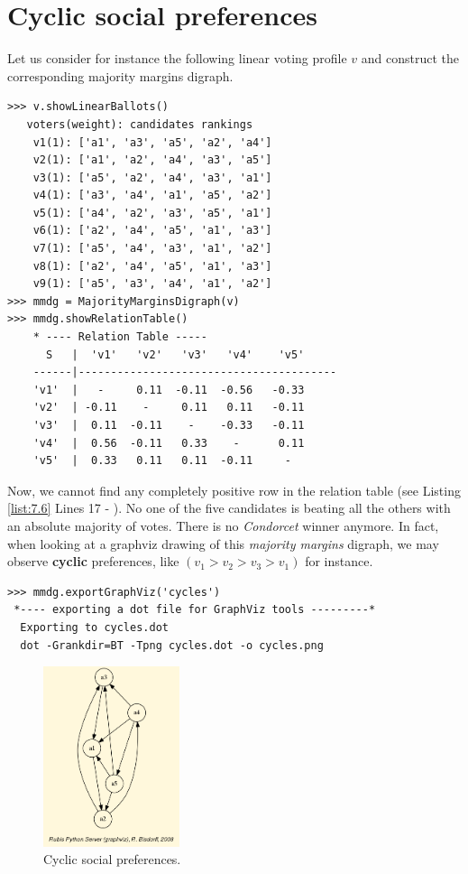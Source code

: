 \section{Cyclic social preferences}
\label{sec:7.4}

Let us consider for instance the following linear voting profile $v$ and construct the corresponding majority margins digraph.
\begin{lstlisting}[caption={Example of cyclic social preferences},label=list:7.6]
>>> v.showLinearBallots()
   voters(weight): candidates rankings
    v1(1): ['a1', 'a3', 'a5', 'a2', 'a4']
    v2(1): ['a1', 'a2', 'a4', 'a3', 'a5']
    v3(1): ['a5', 'a2', 'a4', 'a3', 'a1']
    v4(1): ['a3', 'a4', 'a1', 'a5', 'a2']
    v5(1): ['a4', 'a2', 'a3', 'a5', 'a1']
    v6(1): ['a2', 'a4', 'a5', 'a1', 'a3']
    v7(1): ['a5', 'a4', 'a3', 'a1', 'a2']
    v8(1): ['a2', 'a4', 'a5', 'a1', 'a3']
    v9(1): ['a5', 'a3', 'a4', 'a1', 'a2']
>>> mmdg = MajorityMarginsDigraph(v)
>>> mmdg.showRelationTable()
    * ---- Relation Table -----
      S   |  'v1'   'v2'   'v3'	  'v4'	  'v5'	  
    ------|----------------------------------------
    'v1'  |   -     0.11  -0.11	 -0.56	 -0.33	 
    'v2'  | -0.11    -	   0.11	  0.11	 -0.11	 
    'v3'  |  0.11  -0.11    -	 -0.33	 -0.11	 
    'v4'  |  0.56  -0.11   0.33	   -	  0.11	 
    'v5'  |  0.33   0.11   0.11	 -0.11	   -	 
\end{lstlisting}    
Now, we cannot find any completely positive row in the relation table (see Listing \ref{list:7.6} Lines 17 - ). No one of the five candidates is beating all the others with an absolute majority of votes. There is no \emph{Condorcet} winner anymore. In fact, when looking at a graphviz drawing of this \emph{majority margins} digraph, we may observe \textbf{cyclic} preferences, like $(v_1 > v_2 > v_3 > v_1)$ for instance.
\begin{lstlisting}
>>> mmdg.exportGraphViz('cycles')
 *---- exporting a dot file for GraphViz tools ---------*
  Exporting to cycles.dot
  dot -Grankdir=BT -Tpng cycles.dot -o cycles.png
\end{lstlisting}
\begin{figure}[h]
\sidecaption[t]
\includegraphics[width=4cm]{Figures/cycles.png}
\caption{Cyclic social preferences.}
\label{fig:7.2}       %
\end{figure}
	   
